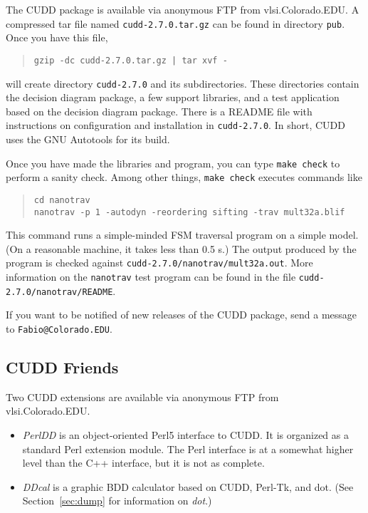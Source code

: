 \documentclass[11pt]{article}
\newcommand{\vnumber}{2.7.0}
\begin{document}
The CUDD package is available via anonymous FTP from
vlsi.Colorado.EDU\@.  A compressed tar file named
\texttt{cudd-\vnumber.tar.gz} can be found in directory \texttt{pub}.
Once you have this file,
\begin{quote}
  \tt gzip -dc cudd-\vnumber.tar.gz | tar xvf -
\end{quote}
will create directory \texttt{cudd-\vnumber} and its subdirectories.
These directories contain the decision diagram package, a few support
libraries, and a test application based on the
decision diagram package.  There is a README file
with instructions on configuration and
installation in \texttt{cudd-\vnumber}.  In short,
CUDD uses the GNU Autotools for its build.

Once you have made the libraries and program, you can type
\texttt{make check} to perform a sanity check.  Among other things,
\texttt{make check} executes commands like
\begin{quote}
  \tt cd nanotrav \\
  nanotrav -p 1 -autodyn -reordering sifting -trav mult32a.blif
\end{quote}
This command runs a simple-minded FSM traversal program on a simple
model. (On a reasonable machine, it takes less than 0.5 s.) The output
produced by the program is checked against
\texttt{cudd-\vnumber/nanotrav/mult32a.out}.  More information on the
\texttt{nanotrav} test program can be found in the file
\texttt{cudd-\vnumber/nanotrav/README}.

If you want to be notified of new releases of the CUDD package, send a
message to \texttt{Fabio@Colorado.EDU}.

\subsection{CUDD Friends}
\label{sec:getFriends}

Two CUDD extensions are available via anonymous FTP from
vlsi.Colorado.EDU\@.
\begin{itemize}
\item \emph{PerlDD} is an object-oriented Perl5 interface to CUDD. It
  is organized as a standard Perl extension module. The Perl interface
  is at a somewhat higher level than the C++ interface, but it is not
  as complete.
\item \emph{DDcal} is a graphic BDD calculator based on CUDD, Perl-Tk,
  and dot. (See Section~\ref{sec:dump} for information on \emph{dot}.)

\end{itemize}
\end{document}
